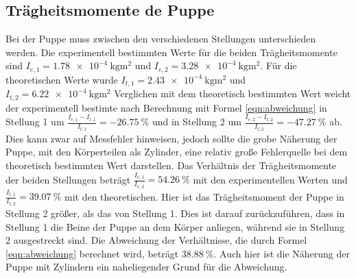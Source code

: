     \subsection{Trägheitsmomente de Puppe}
    Bei der Puppe muss zwischen den verschiedenen Stellungen unterschieden werden.
    Die experimentell bestimmten Werte für die beiden Trägheitsmomente sind $I_{e,1}=\qty{1.78e-4}{\kilo\gram\meter\squared}$ und $I_{e,2}=\qty{3.28e-4}{\kilo\gram\meter\squared}$.
    Für die theoretischen Werte wurde $I_{t,1}=\qty{2.43e-4}{\kilo\gram\meter\squared}$ und $I_{t,2}=\qty{6.22e-4}{\kilo\gram\meter\squared}$
    Verglichen mit dem theoretisch bestimmten Wert weicht der experimentell bestimte nach Berechnung mit Formel \ref{eqn:abweichung} in Stellung 1 um $\frac{I_{e,1}-I_{t,1}}{I_{t,1}}=\qty{-26.75}{\percent}$ und in Stellung 2 um $\frac{I_{e,2}-I_{t,2}}{I_{t,2}}=\qty{-47.27}{\percent}$ ab.
    Dies kann zwar auf Messfehler hinweisen, jedoch sollte die grobe Näherung der Puppe, mit den Körperteilen als Zylinder, eine relativ große Fehlerquelle bei dem theoretisch bestimmten Wert darstellen.
    Das Verhältnis der Trägheitsmomente der beiden Stellungen beträgt $\frac{I_{e,1}}{I_{e,2}}=\qty{54.26}{\percent}$ mit den experimentellen Werten und $\frac{I_{t,1}}{I_{t,2}}=\qty{39.07}{\percent}$ mit den theoretischen.
    Hier ist das Trägheitsmoment der Puppe in Stellung 2 größer, als das von Stellung 1. 
    Dies ist darauf zurückzuführen, dass in Stellung 1 die Beine der Puppe an dem Körper anliegen, während sie in Stellung 2 ausgestreckt sind.
    Die Abweichung der Verhältnisse, die durch Formel \ref{eqn:abweichung} berechnet wird, beträgt $\qty{38.88}{\percent}$.
    Auch hier ist die Näherung der Puppe mit Zylindern ein naheliegender Grund für die Abweichung.